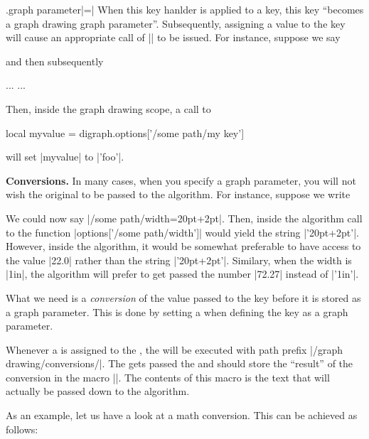 \begin{handler}{{.graph parameter}|=|}
  When this key hanlder is applied to a key, this key ``becomes a
  graph drawing graph parameter''. Subsequently, assigning a value to
  the key will cause an appropriate call of |\pgfgdgraphparameter| to
  be issued. For instance, suppose we say
\begin{codeexample}
\end{codeexample}
  and then subsequently
\begin{codeexample}
...
\pgfgdbeginscope
  ...
\pgfgdendscope
\end{codeexample}
  Then, inside the graph drawing scope, a call to
\begin{codeexample}
   local myvalue = digraph.options['/some path/my key']
\end{codeexample}
  will set |myvalue| to |'foo'|.
  
  \medskip
  \noindent\textbf{Conversions.}
  In many cases, when you specify a graph parameter, you will not wish
  the original  to be passed to the algorithm. For
  instance, suppose we write 
\begin{codeexample}
\end{codeexample}
  We could now say |/some path/width=20pt+2pt|. Then, inside the 
  algorithm call to the function |options['/some path/width']| would yield the
  string |'20pt+2pt'|. However, inside the algorithm, it would be
  somewhat preferable to have access to the value |22.0| rather than the
  string |'20pt+2pt'|. Similary, when the width is |1in|, the algorithm
  will   prefer to get passed the number |72.27| instead of |'1in'|.

  What we need is a \emph{conversion} of the value passed to the key
  before it is stored as a graph parameter. This is done by setting
  a  when defining the key as a graph parameter. 
  
  Whenever a  is assigned to the , the
   will be executed with path prefix
  |/graph drawing/conversions/|. The  gets passed the
   and should store the ``result'' of the
  conversion in the macro |\pgfgdresult|. The contents of this macro is
  the text that will actually be passed down to the algorithm.

  As an example, let us have a look at a math conversion. This can be
  achieved as follows:
\begin{codeexample}
\end{codeexample}


\end{handler}

